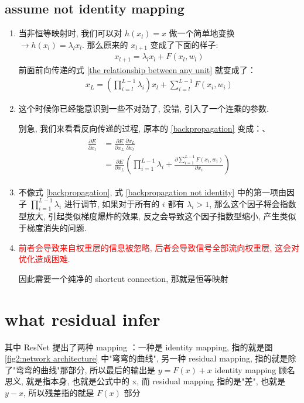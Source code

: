 \documentclass[12pt]{ctexart}%
\begin{document}
		\subsection{\quad assume not identity mapping}
			\begin{enumerate}
				\item 当非恒等映射时, 我们可以对 $h(x_l) = x$ 做一个简单地变换 $\rightarrow h(x_l) = \lambda_l x_l$. 那么原来的 $x_{l+1}$ 变成了下面的样子:
					\begin{align}
						x_{l+1} = \lambda_l x_l + F(x_l, w_l)
					\end{align}
					前面前向传递的式 \ref{the relationship between any unit} 就变成了：
					\begin{align}
						x_L = \left( \prod_{i=l}^{L-1} \lambda_i \right) x_l + \sum_{i=l}^{L-1} F(x_i, w_i)
					\end{align}
					
				\item 这个时候你已经能意识到一些不对劲了, 没错, 引入了一个连乘的参数.
				
					\quad 别急, 我们来看看反向传递的过程, 原本的 \ref{backpropagation} 变成：、
						\begin{align}
							\begin{split}
								\frac{\partial E}{\partial x_l} &= \frac{\partial E}{\partial x_L} \frac{\partial x_L}{\partial x_l} \\
								&= \frac{\partial E}{\partial x_L} \left( \prod_{i=1}^{L-1} \lambda_i + \frac{\partial \sum_{i=1}^{L-1} F(x_i, w_i)}{\partial x_i} \right)
							\end{split} \label{backpropagation not identity}
						\end{align}
						
				\item 不像式 \ref{backpropagation}, 式 \ref{backpropagation not identity} 中的第一项由因子 $\prod_{i=1}^{L-1} \lambda_i$ 进行调节, 如果对于所有的 $i$ 都有 $\lambda_i > 1$, 那么这个因子将会指数型放大, 引起类似梯度爆炸的效果, 反之会导致这个因子指数型缩小, 产生类似于梯度消失的问题.
				
				\item \textcolor{red}{前者会导致来自权重层的信息被忽略, 后者会导致信号全部流向权重层, 这会对优化造成困难.}
				
						\quad 因此需要一个纯净的 shortcut connection, 那就是恒等映射
			\end{enumerate}
		
	\section{\quad what residual infer}
		其中 ResNet 提出了两种 mapping ：一种是 identity mapping, 指的就是图 \ref{fig2:network architecture} 中"弯弯的曲线", 另一种 residual mapping, 指的就是除了"弯弯的曲线"那部分, 所以最后的输出是 $y=F(x)+x$
		identity mapping 顾名思义, 就是指本身, 也就是公式中的 x, 而 residual mapping 指的是"差", 也就是 $y−x$, 所以残差指的就是 $F(x)$ 部分
\end{document}
